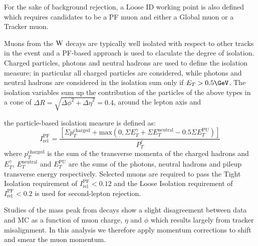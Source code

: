 For the sake of background rejection, a Loose ID working point is
also defined which requires candidates to be a PF muon and either
a Global muon or a Tracker muon.


Muons from the $\mathrm{W}$ decays are typically well isolated with
respect to other tracks in the event and a
 PF-based approach is used to claculate the degree of isolation.
Charged particles, photons and neutral hadrons are used
to define the isolation measure; in particular all charged 
particles are considered, while photons and neutral hadrons
are considered in the isolation sum only if $E_{T} > 0.5 \GeV$.
The isolation variables sum up the contribution of the particles
of the above types in a cone of  
$\Delta R = \sqrt{{\Delta \phi}^2 + {\Delta \eta}^2}=0.4$, 
around the lepton axis and 

the particle-based isolation measure is defined as:
\begin{equation}\label{eq:IsoPF}
I_{\text{rel}}^{\text{PF}} = \frac{\left[\Sigma p_{T}^{\text{charged}}+\text{max}\left( 0, \Sigma E_{T}^{\gamma} + \Sigma E_{T}^{\text{neutral}} - 0.5\Sigma E_{T}^{\text{PU}} \right) \right]}{P_{T}^\ell}
\end{equation}
where $p_{T}^{\text{charged}}$ is the sum of the transverse momenta
of the charged hadrons and   $E_{T}^{\gamma}$, $E_{T}^{\text{neutral}}$
and $E_{T}^{\text{PU}}$ are the sums of the photons, neutral 
hadrons and pileup transverse energy respectively. 
Selected muons are required to pass the Tight Isolation requirement
of $I_{\text{rel}}^{\text{PF}} < 0.12$ and the Loose Isolation requirement
of $I_{\text{rel}}^{\text{PF}} < 0.2$ is used for second-lepton rejection. 

Studies of the \MyZ mass peak from \Zmm decays show a slight disagreement 
between data and MC as a function of muon charge, $\eta$ and $\phi$ which 
results largely from tracker misalignment. In
this analysis we therefore apply momentum corrections to shift
and smear the muon momentum.



